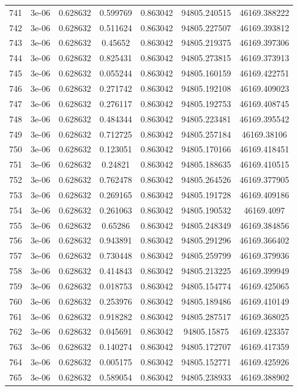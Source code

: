 \begin{table}
\begin{tabular*}{\linewidth}{c|c|c|c|c|c|c}
741 & 3e-06 & 0.628632 & 0.599769 & 0.863042 & 94805.240515 & 46169.388222\\
742 & 3e-06 & 0.628632 & 0.511624 & 0.863042 & 94805.227507 & 46169.393812\\
743 & 3e-06 & 0.628632 & 0.45652 & 0.863042 & 94805.219375 & 46169.397306\\
744 & 3e-06 & 0.628632 & 0.825431 & 0.863042 & 94805.273815 & 46169.373913\\
745 & 3e-06 & 0.628632 & 0.055244 & 0.863042 & 94805.160159 & 46169.422751\\
746 & 3e-06 & 0.628632 & 0.271742 & 0.863042 & 94805.192108 & 46169.409023\\
747 & 3e-06 & 0.628632 & 0.276117 & 0.863042 & 94805.192753 & 46169.408745\\
748 & 3e-06 & 0.628632 & 0.484344 & 0.863042 & 94805.223481 & 46169.395542\\
749 & 3e-06 & 0.628632 & 0.712725 & 0.863042 & 94805.257184 & 46169.38106\\
750 & 3e-06 & 0.628632 & 0.123051 & 0.863042 & 94805.170166 & 46169.418451\\
751 & 3e-06 & 0.628632 & 0.24821 & 0.863042 & 94805.188635 & 46169.410515\\
752 & 3e-06 & 0.628632 & 0.762478 & 0.863042 & 94805.264526 & 46169.377905\\
753 & 3e-06 & 0.628632 & 0.269165 & 0.863042 & 94805.191728 & 46169.409186\\
754 & 3e-06 & 0.628632 & 0.261063 & 0.863042 & 94805.190532 & 46169.4097\\
755 & 3e-06 & 0.628632 & 0.65286 & 0.863042 & 94805.248349 & 46169.384856\\
756 & 3e-06 & 0.628632 & 0.943891 & 0.863042 & 94805.291296 & 46169.366402\\
757 & 3e-06 & 0.628632 & 0.730448 & 0.863042 & 94805.259799 & 46169.379936\\
758 & 3e-06 & 0.628632 & 0.414843 & 0.863042 & 94805.213225 & 46169.399949\\
759 & 3e-06 & 0.628632 & 0.018753 & 0.863042 & 94805.154774 & 46169.425065\\
760 & 3e-06 & 0.628632 & 0.253976 & 0.863042 & 94805.189486 & 46169.410149\\
761 & 3e-06 & 0.628632 & 0.918282 & 0.863042 & 94805.287517 & 46169.368025\\
762 & 3e-06 & 0.628632 & 0.045691 & 0.863042 & 94805.15875 & 46169.423357\\
763 & 3e-06 & 0.628632 & 0.140274 & 0.863042 & 94805.172707 & 46169.417359\\
764 & 3e-06 & 0.628632 & 0.005175 & 0.863042 & 94805.152771 & 46169.425926\\
765 & 3e-06 & 0.628632 & 0.589054 & 0.863042 & 94805.238933 & 46169.388902\\
\end{tabular*}
\end{table}
